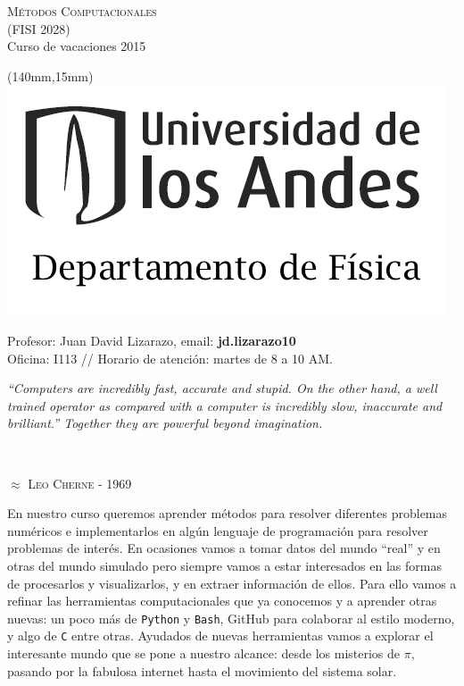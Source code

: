 \documentclass[letterpaper,10pt,onecolumn]{article}
\begin{document}
\thispagestyle{empty}
\begin{flushleft}


\textsc{\huge Métodos Computacionales}\\[0.01cm]

\normalsize (FISI 2028) \\
Curso de vacaciones 2015

\end{flushleft}

		\begin{textblock*}{20mm}(140mm,15mm)
  			\includegraphics[height=30 mm]{andes.png}
		\end{textblock*}

\noindent
Profesor: Juan David Lizarazo, email: \textbf{jd.lizarazo10}\\
Oficina: I113 // Horario de atención: martes de 8 a 10 AM. \\ 
\vspace{0.3cm}

\hfill\begin{minipage}{\dimexpr\textwidth-3cm}
\begin{flushright}\textit{``Computers are incredibly fast, accurate and stupid. On the other hand, a well trained operator as compared with a computer is incredibly slow, inaccurate and brilliant.'' Together they are powerful beyond imagination.}\end{flushright}
\end{minipage}

\noindent \\[-0.7cm]
\begin{flushright}\textsc{$\approx$ Leo Cherne - 1969}\end{flushright}

\vspace{0.1cm}


En nuestro curso queremos aprender métodos para resolver diferentes problemas numéricos e implementarlos en algún lenguaje de programación para resolver problemas de interés. En ocasiones vamos a tomar datos del mundo ``real'' y en otras del mundo simulado pero siempre vamos a estar interesados en las formas de procesarlos y visualizarlos, y en extraer información de ellos. Para ello vamos a refinar las herramientas computacionales que ya conocemos y a aprender otras nuevas: un poco más de \verb+Python+ y \verb+Bash+, GitHub para colaborar al estilo moderno, y algo de \verb+C+ entre otras. Ayudados de nuevas herramientas vamos a explorar el interesante mundo que se pone a nuestro alcance: desde los misterios de $\pi$, pasando por la fabulosa internet  hasta el movimiento del sistema solar.
\end{document}
